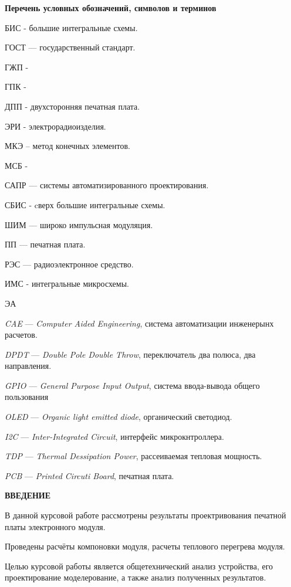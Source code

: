 \tableofcontents
\newpage
\begin{center}
\textbf{Перечень условных обозначений, символов и терминов}
\end{center}

БИС - большие интегральные схемы.

ГОСТ — государственный стандарт.

ГЖП -

ГПК -

ДПП - двухсторонняя печатная плата.

ЭРИ - электрорадиоизделия.

МКЭ – метод конечных элементов.

МСБ -

САПР — системы автоматизированного проектирования.

СБИС - cверх большие интегральные схемы.

ШИМ — широко импульсная модуляция.

ПП — печатная плата.

РЭС — радиоэлектронное средство.

ИМС - интегральные микросхемы.

ЭА

\textit{CAE} — \textit{Computer Aided Engineering}, система автоматизации инженерынх расчетов.

\textit{DPDT} — \textit{Double Pole Double Throw}, переключатель два полюса, два направления.

\textit{GPIO} — \textit{ General Purpose Input Output}, система ввода-вывода общего пользования

\textit{OLED} — \textit{Organic light emitted diode}, органический светодиод.

\textit{I2C} — \textit{Inter-Integrated Circuit}, интерфейс микрокнтроллера.

\textit{TDP} — \textit{Thermal Dessipation Power}, рассеиваемая тепловая мощность.

\textit{PCB} — \textit{Printed Circuti Board}, печатная плата.

\newpage

\begin{center}
\textbf{ВВЕДЕНИЕ}
\end{center}


В данной курсовой работе рассмотрены результаты проектривования 
печатной платы электронного модуля.

Проведены расчёты компоновки модуля, расчеты теплового перегрева
модуля.

Целью курсовой работы является общетехнический анализ устройства,
его проектирование моделерование, а также анализ полученных результатов.

\newpage
